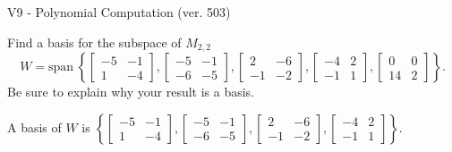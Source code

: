 \begin{exercise}
  \begin{exerciseTitle}V9 - Polynomial Computation (ver. 503)\end{exerciseTitle}
  \begin{exerciseStatement}
    Find a basis for the subspace of \(M_{2,2}\) 
\[W=\mathrm{span}\ \left\{\left[\begin{array}{cc}
-5 & -1 \\
1 & -4
\end{array}\right] , \left[\begin{array}{cc}
-5 & -1 \\
-6 & -5
\end{array}\right] , \left[\begin{array}{cc}
2 & -6 \\
-1 & -2
\end{array}\right] , \left[\begin{array}{cc}
-4 & 2 \\
-1 & 1
\end{array}\right] , \left[\begin{array}{cc}
0 & 0 \\
14 & 2
\end{array}\right]\right\}.\]
 Be sure to explain why your result is a basis.


  \end{exerciseStatement}
  \begin{exerciseAnswer}
   A basis of \(W\) is  \(\left\{\left[\begin{array}{cc}
-5 & -1 \\
1 & -4
\end{array}\right] , \left[\begin{array}{cc}
-5 & -1 \\
-6 & -5
\end{array}\right] , \left[\begin{array}{cc}
2 & -6 \\
-1 & -2
\end{array}\right] , \left[\begin{array}{cc}
-4 & 2 \\
-1 & 1
\end{array}\right]\right\}\).
  


  \end{exerciseAnswer}
\end{exercise}